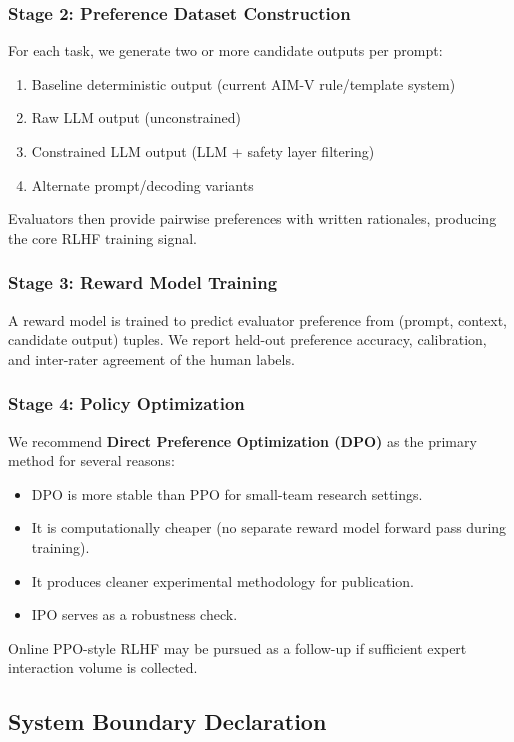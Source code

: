 \documentclass[11pt,a4paper]{article}
\begin{document}
\subsubsection{Stage 2: Preference Dataset Construction}
For each task, we generate two or more candidate outputs per prompt:
\begin{enumerate}
    \item Baseline deterministic output (current AIM-V rule/template system)
    \item Raw LLM output (unconstrained)
    \item Constrained LLM output (LLM + safety layer filtering)
    \item Alternate prompt/decoding variants
\end{enumerate}
Evaluators then provide pairwise preferences with written rationales, producing the core RLHF training signal.

\subsubsection{Stage 3: Reward Model Training}
A reward model is trained to predict evaluator preference from (prompt, context, candidate output) tuples. We report held-out preference accuracy, calibration, and inter-rater agreement of the human labels.

\subsubsection{Stage 4: Policy Optimization}
We recommend \textbf{Direct Preference Optimization (DPO)} \cite{rafailov2023dpo} as the primary method for several reasons:
\begin{itemize}
    \item DPO is more stable than PPO for small-team research settings.
    \item It is computationally cheaper (no separate reward model forward pass during training).
    \item It produces cleaner experimental methodology for publication.
    \item IPO \cite{azar2023ipo} serves as a robustness check.
\end{itemize}
Online PPO-style RLHF may be pursued as a follow-up if sufficient expert interaction volume is collected.

\subsection{System Boundary Declaration}
\end{document}
